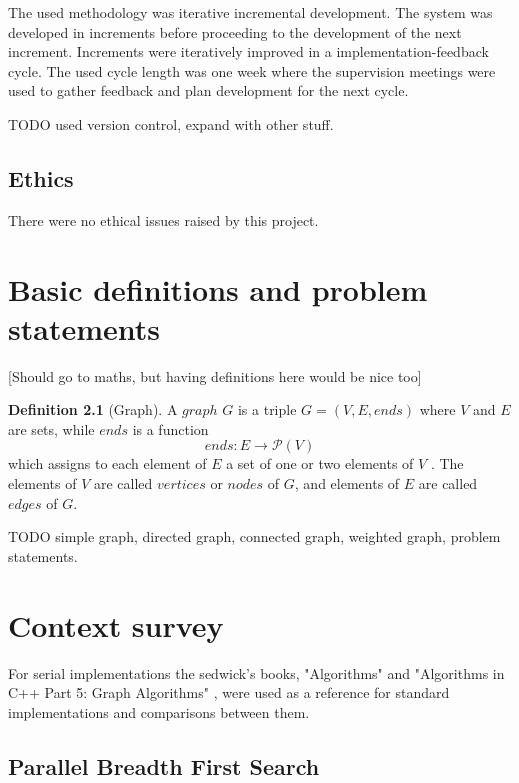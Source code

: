 \documentclass{report}
\theoremstyle{plain}
\theoremstyle{definition}
\newtheorem{definition}{Definition}
\theoremstyle{remark}
\begin{document}
The used methodology was iterative incremental development. The system was developed in increments before proceeding to the development of the next increment. Increments were iteratively improved in a implementation-feedback cycle. The used cycle length was one week where the supervision meetings were used to gather feedback and plan development for the next cycle. 

TODO used version control, expand with other stuff.

\section{Ethics}

There were no ethical issues raised by this project.

\chapter{Basic definitions and problem statements}

[Should go to maths, but having definitions here would be nice too]

\begin{definition}[Graph]
A $graph$  $G$ is a triple $G = (V, E, ends)$ where $V$ and $E$ are sets, while $ends$ is a function 
  \begin{equation}
  ends:E\to \mathcal P \left({V}\right)
  \end{equation}
which assigns to each element of $E$ a set of one or two elements of $V$ . The elements of $V$ are called $vertices$ or $nodes$ of $G$, and elements of $E$ are called $edges$ of $G$.
\end{definition}

TODO simple graph, directed graph, connected graph, weighted graph, problem statements. 

\chapter{Context survey}

For serial implementations the sedwick's books, "Algorithms" \cite{algo_sedgewick} and "Algorithms in C++ Part 5: Graph Algorithms" \cite{c++_sedgewick}, were used as a reference for standard implementations and comparisons between them.

\section{Parallel Breadth First Search}
\end{document}
